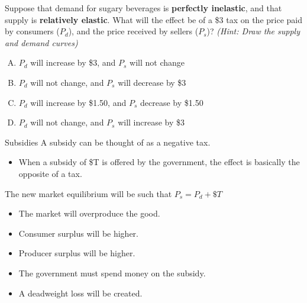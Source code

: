 \documentclass[11pt,t]{beamer}
\begin{document}
\begin{frame}{}

  Suppose that demand for sugary beverages is \textbf{perfectly inelastic}, and that supply is \textbf{relatively elastic}. What will the effect be of a \$3 tax on the price paid by consumers ($P_d$), and the price received by sellers ($P_s$)? \emph{(Hint: Draw the supply and demand curves)}

  \bigskip
  \begin{enumerate}[A)]
    \item $P_d$ will increase by \$3, and $P_s$ will not change
    \item $P_d$ will not change, and $P_s$ will decrease by \$3
    \item $P_d$ will increase by \$1.50, and $P_s$ decrease by \$1.50
    \item $P_d$ will not change, and $P_s$ will increase by \$3
  \end{enumerate}
\end{frame}

\begin{frame}{Subsidies}
  A subsidy can be thought of as a negative tax.
  \begin{itemize}
    \item When a subsidy of \$T is offered by the government, the effect is basically the opposite of a tax.
  \end{itemize}

  \bigskip\pause
  The new market equilibrium will be such that $P_s = P_d + \$T$

  \begin{itemize}
    \item The market will overproduce the good.
    \item Consumer surplus will be higher.
    \item Producer surplus will be higher.
    \item The government must spend money on the subsidy.
    \item A deadweight loss will be created.
  \end{itemize}
\end{frame}
\end{document}
